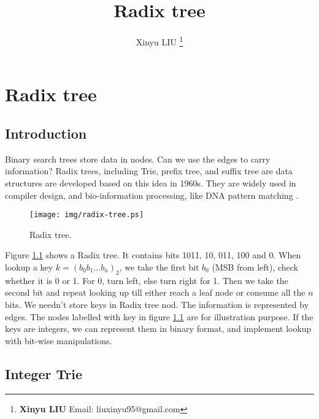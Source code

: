 \documentclass[b5paper]{article}
\begin{document}
\title{Radix tree}

\author{Xinyu LIU
\thanks{{\bfseries Xinyu LIU} \newline
  Email: liuxinyu95@gmail.com \newline}
  }

\maketitle
\fi


\ifx\wholebook\relax
\chapter{Radix tree}
\fi

\section{Introduction}
\label{introduction} 

Binary search trees store data in nodes. Can we use the edges to carry information? Radix trees, including Trie, prefix tree, and suffix tree are data structures are developed based on this idea in 1960s. They are widely used in compiler design\cite{okasaki-int-map}, and bio-information processing, like DNA pattern matching \cite{wiki-suffix-tree}.

\begin{figure}[htbp]
  \centering
  \texttt{[image: img/radix-tree.ps]}
  \caption{Radix tree.}
  \label{fig:radix-tree}
\end{figure}

Figure \ref{fig:radix-tree} shows a Radix tree. It contains bits 1011, 10, 011, 100 and 0. When lookup a key $k=(b_0b_1...b_n)_2$, we take the first bit $b_0$ (MSB from left), check whether it is 0 or 1. For 0, turn left, else turn right for 1. Then we take the second bit and repeat looking up till either reach a leaf node or consume all the $n$ bits. We needn't store keys in Radix tree nod. The information is represented by edges. The nodes labelled with key in figure \ref{fig:radix-tree} are for illustration purpose. If the keys are integers, we can represent them in binary format, and implement lookup with bit-wise manipulations.

\section{Integer Trie}
\label{int-trie} 
\end{document}
